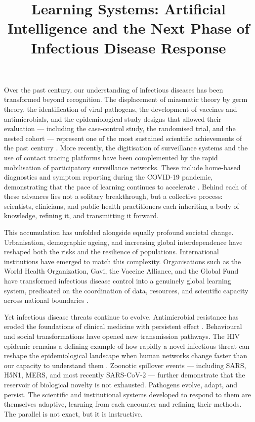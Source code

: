 \documentclass[12pt]{article}
\title{Learning Systems: Artificial Intelligence and the Next Phase of Infectious Disease Response}
\author{}
\date{}
\begin{document}
\maketitle

\doublespacing

Over the past century, our understanding of infectious diseases has been transformed beyond recognition. The displacement of miasmatic theory by germ theory, the identification of viral pathogens, the development of vaccines and antimicrobials, and the epidemiological study designs that allowed their evaluation --- including the case-control study, the randomised trial, and the nested cohort --- represent one of the most sustained scientific achievements of the past century \cite{snow1855,doll1950}. More recently, the digitisation of surveillance systems and the use of contact tracing platforms have been complemented by the rapid mobilisation of participatory surveillance networks. These include home-based diagnostics and symptom reporting during the COVID-19 pandemic, demonstrating that the pace of learning continues to accelerate \cite{brownstein2009,paolotti2014}. Behind each of these advances lies not a solitary breakthrough, but a collective process: scientists, clinicians, and public health practitioners each inheriting a body of knowledge, refining it, and transmitting it forward.

This accumulation has unfolded alongside equally profound societal change. Urbanisation, demographic ageing, and increasing global interdependence have reshaped both the risks and the resilience of populations. International institutions have emerged to match this complexity. Organisations such as the World Health Organization, Gavi, the Vaccine Alliance, and the Global Fund have transformed infectious disease control into a genuinely global learning system, predicated on the coordination of data, resources, and scientific capacity across national boundaries \cite{gavi2023}.

Yet infectious disease threats continue to evolve. Antimicrobial resistance has eroded the foundations of clinical medicine with persistent effect \cite{who2015}. Behavioural and social transformations have opened new transmission pathways. The HIV epidemic remains a defining example of how rapidly a novel infectious threat can reshape the epidemiological landscape when human networks change faster than our capacity to understand them \cite{fauci1999}. Zoonotic spillover events --- including SARS, H5N1, MERS, and most recently SARS-CoV-2 --- further demonstrate that the reservoir of biological novelty is not exhausted. Pathogens evolve, adapt, and persist. The scientific and institutional systems developed to respond to them are themselves adaptive, learning from each encounter and refining their methods. The parallel is not exact, but it is instructive.
\end{document}
